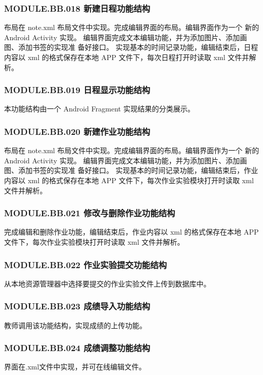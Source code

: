 \subsubsection{MODULE.BB.018    新建日程功能结构}
布局在 note.xml 布局文件中实现。完成编辑界面的布局。编辑界面作为一个 新的 Android Activity 实现。
编辑界面完成文本编辑功能，并为添加图片、添加画图、添加书签的实现准 备好接口。
实现基本的时间记录功能，编辑结束后，日程内容以 xml 的格式保存在本地 APP 文件下，每次日程打开时读取 xml 文件并解析。

\subsubsection{MODULE.BB.019    日程显示功能结构}
本功能结构由一个 Android Fragment 实现结果的分类展示。

\subsubsection{MODULE.BB.020    新建作业功能结构}
布局在 note.xml 布局文件中实现。完成编辑界面的布局。编辑界面作为一个 新的 Android Activity 实现。
编辑界面完成文本编辑功能，并为添加图片、添加画图、添加书签的实现准 备好接口。
实现基本的时间记录功能，编辑结束后，作业内容以 xml 的格式保存在本地 APP 文件下，每次作业实验模块打开时读取 xml 文件并解析。

\subsubsection{MODULE.BB.021    修改与删除作业功能结构}
完成编辑和删除作业功能，编辑结束后，作业内容以 xml 的格式保存在本地 APP 文件下，每次作业实验模块打开时读取 xml 文件并解析。

\subsubsection{MODULE.BB.022    作业实验提交功能结构}
从本地资源管理器中选择要提交的作业实验文件上传到数据库中。

\subsubsection{MODULE.BB.023    成绩导入功能结构}
教师调用该功能结构，实现成绩的上传功能。

\subsubsection{MODULE.BB.024    成绩调整功能结构}
界面在.xml文件中实现，并可在线编辑文件。

